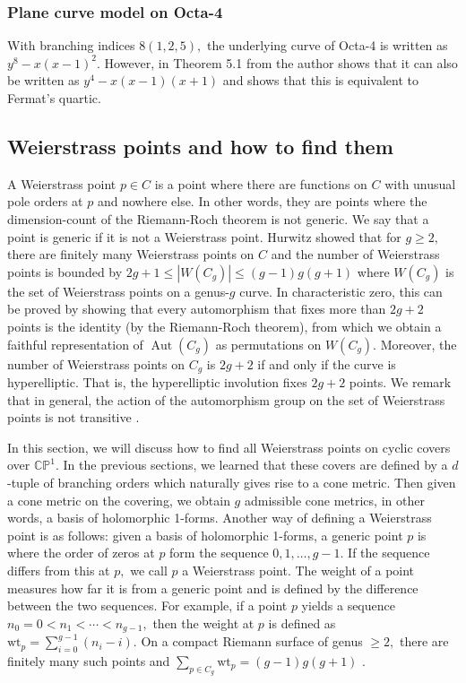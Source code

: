 \documentclass[12pt,reqno]{amsart}
\DeclareMathOperator{\Aut}{Aut}
\theoremstyle{definition}
\theoremstyle{remark}
\begin{document}
\subsubsection*{Plane curve model on Octa-4}
With branching indices $8 (1, 2, 5),$ the underlying curve of Octa-4 is written as $y^8 - x (x-1)^2.$ However, in Theorem 5.1 from \cite{dami} the author shows that it can also be written as $y^4 - x (x-1) (x+1)$ and shows that this is equivalent to Fermat's quartic.

\subsection{Weierstrass points and how to find them}

A Weierstrass point $p \in C$ is a point where there are functions on $C$ with unusual pole orders at $p$ and nowhere else. In other words, they are points where the dimension-count of the Riemann-Roch theorem is not generic. We say that a point is generic if it is not a Weierstrass point. Hurwitz showed that for $g \geq 2,$ there are finitely many Weierstrass points on $C$ and the number of Weierstrass points is bounded by $2 g + 1 \leq |W(C_g)| \leq (g - 1) g (g + 1)$ where $W(C_g)$ is the set of Weierstrass points on a genus-$g$ curve. In characteristic zero, this can be proved by showing that every automorphism that fixes more than $2 g + 2$ points is the identity (by the Riemann-Roch theorem), from which we obtain a faithful representation of $\Aut(C_g)$ as permutations on $W(C_g)$. Moreover, the number of Weierstrass points on $C_g$ is $2 g + 2$ if and only if the curve is hyperelliptic. That is, the hyperelliptic involution fixes $2 g + 2$ points. We remark that in general, the action of the automorphism group on the set of Weierstrass points is not transitive \cite{sl}. 


In this section, we will discuss how to find all Weierstrass points on cyclic covers over $\mathbb{C}\mathbb{P}^1.$ In the previous sections, we learned that these covers are defined by a $d$-tuple of branching orders which naturally gives rise to a cone metric. Then given a cone metric on the covering, we obtain $g$ admissible cone metrics, in other words, a basis of holomorphic 1-forms. Another way of defining a Weierstrass point is as follows: given a basis of holomorphic 1-forms, a generic point $p$ is where the order of zeros at $p$ form the sequence $0, 1, \ldots , g - 1.$ If the sequence differs from this at $p,$ we call $p$ a Weierstrass point. The weight of a point measures how far it is from a generic point and is defined by the difference between the two sequences. For example, if a point $p$ yields a sequence $n_0 = 0 < n_1 < \cdots < n_{g-1},$ then the weight at $p$ is defined as $\textrm{wt}_p = \sum\limits_{i=0}^{g-1} (n_i - i).$ On a compact Riemann surface of genus $\geq 2,$ there are finitely many such points and $\sum\limits_{p \in C_g} \textrm{wt}_p = (g - 1) g (g + 1)$ \cite{fk}. 
\end{document}
